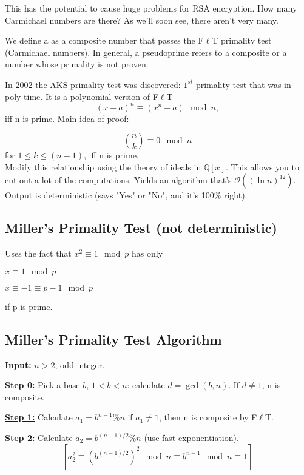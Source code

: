 This has the potential to cause huge problems for RSA encryption. How many Carmichael numbers are there? As we'll soon see, there aren't very many. 

\begin{definition} We define a  as a composite number that passes the F$\ell$T primality test (Carmichael numbers). In general, a pseudoprime refers to a composite or a number whose primality is not proven.

In 2002 the AKS primality test was discovered: $1^{st}$ primality test that was in poly-time. It is a polynomial version of F$\ell$T
$$(x - a)^{n} \equiv (x^{n} - a) \mod n,$$
iff n is prime. Main idea of proof:

$$ {n \choose k} \equiv  0  \mod n$$
for $1 \leq k \leq (n-1)$, iff n is prime.
\\

Modify this relationship using the theory of ideals in $\mathbb{Q}[x]$. This allows you to cut out a lot of the computations. Yields an algorithm that's 
$\mathcal{O}((\ln{n})^{12})$. Output is deterministic (says "Yes" or "No", and it's 100\% right).

\subsection{Miller's Primality Test (not deterministic)}
Uses the fact that $x^{2} \equiv 1 \mod p$ has only 

$x \equiv 1 \mod p$ 

$x \equiv -1 \equiv p-1 \mod p$ 

\noindent if p is prime.

\subsection{Miller's Primality Test Algorithm}

\textbf{\underline{Input:}} $n > 2$, odd integer.


\noindent \textbf{\underline{Step 0:}} Pick a base $b$, $1 < b < n$: calculate $d = \gcd(b, n)$.
If $d \ne 1$, n is composite. 


\noindent \textbf{\underline{Step 1:}} Calculate $a_{1} = b^{n - 1} \% n $ if $a_{1} \ne 1$, then n is composite by F$\ell$T.


\noindent \textbf{\underline{Step 2:}} Calculate $a_{2} = b^{(n-1)/2} \% n$ (use fast exponentiation).
$$[a_{2}^{2} \equiv (b^{(n-1)/2})^2 \mod n \equiv b^{n-1} \mod n \equiv 1]$$


\end{definition}
